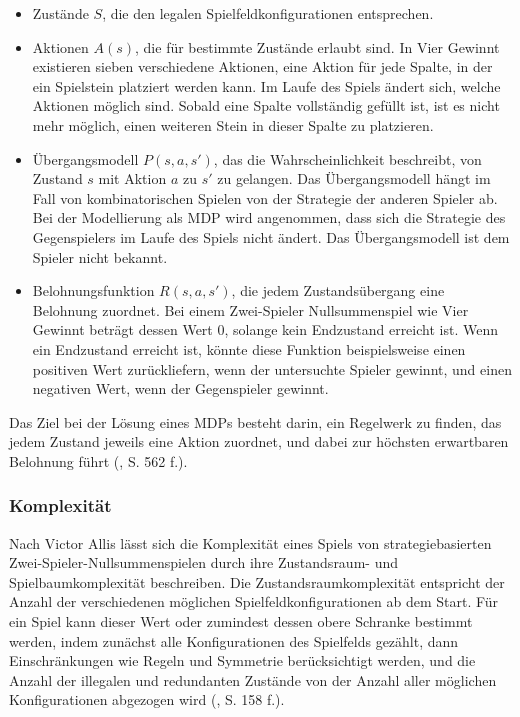 \begin{itemize}
	
\item Zustände $S$, die den legalen Spielfeldkonfigurationen entsprechen.
\item Aktionen $A(s)$, die für bestimmte Zustände erlaubt sind. In Vier Gewinnt existieren sieben verschiedene Aktionen, eine Aktion für jede Spalte, in der ein Spielstein platziert werden kann. Im Laufe des Spiels ändert sich, welche Aktionen möglich sind. Sobald eine Spalte vollständig gefüllt ist, ist es nicht mehr möglich, einen weiteren Stein in dieser Spalte zu platzieren.
\item Übergangsmodell $P(s, a, s')$, das die Wahrscheinlichkeit beschreibt, von Zustand $s$ mit Aktion $a$ zu $s'$ zu gelangen. Das Übergangsmodell hängt im Fall von kombinatorischen Spielen von der Strategie der anderen Spieler ab. Bei der Modellierung als MDP wird angenommen, dass sich die Strategie des Gegenspielers im Laufe des Spiels nicht ändert. Das Übergangsmodell ist dem Spieler nicht bekannt.
\item Belohnungsfunktion $R(s, a, s')$, die jedem Zustandsübergang eine Belohnung zuordnet. Bei einem Zwei-Spieler Nullsummenspiel wie Vier Gewinnt beträgt dessen Wert 0, solange kein Endzustand erreicht ist. Wenn ein Endzustand erreicht ist, könnte diese Funktion beispielsweise einen positiven Wert zurückliefern, wenn der untersuchte Spieler gewinnt, und einen negativen Wert, wenn der Gegenspieler gewinnt.

\end{itemize}

Das Ziel bei der Lösung eines MDPs besteht darin, ein Regelwerk zu finden, das jedem Zustand jeweils eine Aktion zuordnet, und dabei zur höchsten erwartbaren Belohnung führt (\cite{Russell.2020}, S. 562 f.).

\subsubsection{Komplexität}

Nach Victor Allis lässt sich die Komplexität eines Spiels von strategiebasierten Zwei-Spieler-Nullsummenspielen durch ihre Zustandsraum- und Spielbaumkomplexität beschreiben. Die Zustandsraumkomplexität entspricht der Anzahl der verschiedenen möglichen Spielfeldkonfigurationen ab dem Start. Für ein Spiel kann dieser Wert oder zumindest dessen obere Schranke bestimmt werden, indem zunächst alle Konfigurationen des Spielfelds gezählt, dann Einschränkungen wie Regeln und Symmetrie berücksichtigt werden, und die Anzahl der illegalen und redundanten Zustände von der Anzahl aller möglichen Konfigurationen abgezogen wird (\cite{Allis.1994}, S. 158 f.).


